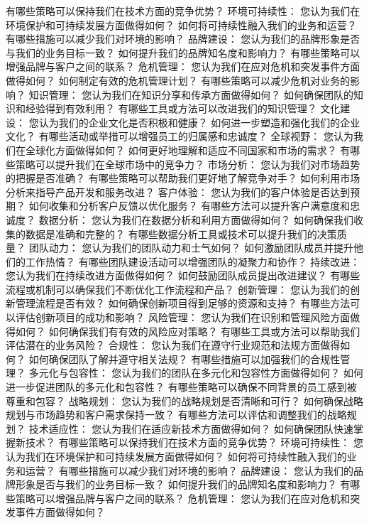 \documentclass[12pt]{book}
\begin{document}
有哪些策略可以保持我们在技术方面的竞争优势？
环境可持续性：
您认为我们在环境保护和可持续发展方面做得如何？
如何将可持续性融入我们的业务和运营？
有哪些措施可以减少我们对环境的影响？
品牌建设：
您认为我们的品牌形象是否与我们的业务目标一致？
如何提升我们的品牌知名度和影响力？
有哪些策略可以增强品牌与客户之间的联系？
危机管理：
您认为我们在应对危机和突发事件方面做得如何？
如何制定有效的危机管理计划？
有哪些策略可以减少危机对业务的影响？
知识管理：
您认为我们在知识分享和传承方面做得如何？
如何确保团队的知识和经验得到有效利用？
有哪些工具或方法可以改进我们的知识管理？
文化建设：
您认为我们的企业文化是否积极和健康？
如何进一步塑造和强化我们的企业文化？
有哪些活动或举措可以增强员工的归属感和忠诚度？
全球视野：
您认为我们在全球化方面做得如何？
如何更好地理解和适应不同国家和市场的需求？
有哪些策略可以提升我们在全球市场中的竞争力？
市场分析：
您认为我们对市场趋势的把握是否准确？
有哪些策略可以帮助我们更好地了解竞争对手？
如何利用市场分析来指导产品开发和服务改进？
客户体验：
您认为我们的客户体验是否达到预期？
如何收集和分析客户反馈以优化服务？
有哪些方法可以提升客户满意度和忠诚度？
数据分析：
您认为我们在数据分析和利用方面做得如何？
如何确保我们收集的数据是准确和完整的？
有哪些数据分析工具或技术可以提升我们的决策质量？
团队动力：
您认为我们的团队动力和士气如何？
如何激励团队成员并提升他们的工作热情？
有哪些团队建设活动可以增强团队的凝聚力和协作？
持续改进：
您认为我们在持续改进方面做得如何？
如何鼓励团队成员提出改进建议？
有哪些流程或机制可以确保我们不断优化工作流程和产品？
创新管理：
您认为我们的创新管理流程是否有效？
如何确保创新项目得到足够的资源和支持？
有哪些方法可以评估创新项目的成功和影响？
风险管理：
您认为我们在识别和管理风险方面做得如何？
如何确保我们有有效的风险应对策略？
有哪些工具或方法可以帮助我们评估潜在的业务风险？
合规性：
您认为我们在遵守行业规范和法规方面做得如何？
如何确保团队了解并遵守相关法规？
有哪些措施可以加强我们的合规性管理？
多元化与包容性：
您认为我们的团队在多元化和包容性方面做得如何？
如何进一步促进团队的多元化和包容性？
有哪些策略可以确保不同背景的员工感到被尊重和包容？
战略规划：
您认为我们的战略规划是否清晰和可行？
如何确保战略规划与市场趋势和客户需求保持一致？
有哪些方法可以评估和调整我们的战略规划？
技术适应性：
您认为我们在适应新技术方面做得如何？
如何确保团队快速掌握新技术？
有哪些策略可以保持我们在技术方面的竞争优势？
环境可持续性：
您认为我们在环境保护和可持续发展方面做得如何？
如何将可持续性融入我们的业务和运营？
有哪些措施可以减少我们对环境的影响？
品牌建设：
您认为我们的品牌形象是否与我们的业务目标一致？
如何提升我们的品牌知名度和影响力？
有哪些策略可以增强品牌与客户之间的联系？
危机管理：
您认为我们在应对危机和突发事件方面做得如何？
\end{document}
